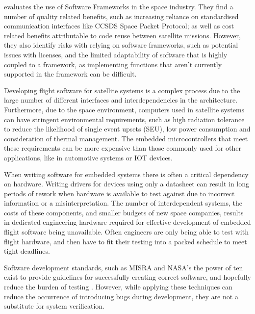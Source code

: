 \documentclass[../report.tex]{subfiles}
\begin{document}
\citet{Farges_2022} evaluates the use of Software Frameworks in the space
industry. They find a number of quality related benefits, such as increasing
reliance on standardised communication interfaces like CCSDS Space Packet
Protocol; as well as cost related benefits attributable to code reuse between
satellite missions. However, they also identify risks with relying on software
frameworks, such as potential issues with licenses, and the limited
adaptability of software that is highly coupled to a framework, as implementing
functions that aren't currently supported in the framework can be difficult.

Developing flight software for satellite systems is a complex process due to
the large number of different interfaces and interdependencies in the
architecture. Furthermore, due to the space environment, computers used in
satellite systems can have stringent environmental requirements, such as high
radiation tolerance to reduce the likelihood of single event upsets (SEU), low
power consumption and consideration of thermal management. The embedded
microcontrollers that meet these requirements can be more expensive than those
commonly used for other applications, like in automotive systems or IOT devices.

When writing software for embedded systems there is often a critical dependency
on hardware. Writing drivers for devices using only a datasheet can result in
long periods of rework when hardware is available to test against due to
incorrect information or a misinterpretation. The number of interdependent
systems, the costs of these components, and smaller budgets of new space
companies, results in dedicated engineering hardware required for effective
development of embedded flight software being unavailable. Often engineers are
only being able to test with flight hardware, and then have to fit their
testing into a packed schedule to meet tight deadlines.

Software development standards, such as MISRA and NASA's the power of ten exist
to provide guidelines for successfully creating correct software, and hopefully
reduce the burden of testing \citep{MISRA} \citep{NASA}. %
However, while applying these techniques can
reduce the occurrence of introducing bugs during development, they are not a
substitute for system verification.

\end{document}
